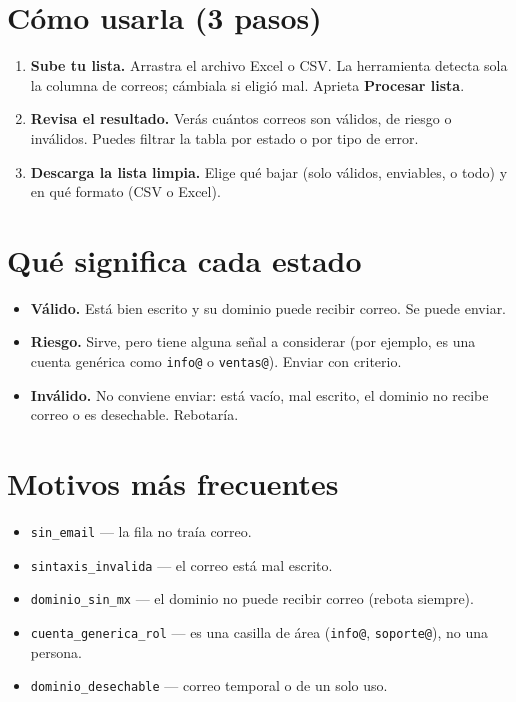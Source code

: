 \documentclass[12pt]{article}
\begin{document}
\section{Cómo usarla (3 pasos)}
\begin{enumerate}[label=\textbf{\arabic*.}]
    \item \textbf{Sube tu lista.} Arrastra el archivo Excel o CSV. La herramienta detecta
    sola la columna de correos; cámbiala si eligió mal. Aprieta \textbf{Procesar lista}.
    \item \textbf{Revisa el resultado.} Verás cuántos correos son válidos, de riesgo o
    inválidos. Puedes filtrar la tabla por estado o por tipo de error.
    \item \textbf{Descarga la lista limpia.} Elige qué bajar (solo válidos, enviables, o
    todo) y en qué formato (CSV o Excel).
\end{enumerate}

\section{Qué significa cada estado}
\begin{itemize}
    \item \textbf{Válido.} Está bien escrito y su dominio puede recibir correo. Se puede enviar.
    \item \textbf{Riesgo.} Sirve, pero tiene alguna señal a considerar (por ejemplo, es una
    cuenta genérica como \texttt{info@} o \texttt{ventas@}). Enviar con criterio.
    \item \textbf{Inválido.} No conviene enviar: está vacío, mal escrito, el dominio no recibe
    correo o es desechable. Rebotaría.
\end{itemize}

\section{Motivos más frecuentes}
\begin{itemize}
    \item \texttt{sin\_email} --- la fila no traía correo.
    \item \texttt{sintaxis\_invalida} --- el correo está mal escrito.
    \item \texttt{dominio\_sin\_mx} --- el dominio no puede recibir correo (rebota siempre).
    \item \texttt{cuenta\_generica\_rol} --- es una casilla de área (\texttt{info@},
    \texttt{soporte@}), no una persona.
    \item \texttt{dominio\_desechable} --- correo temporal o de un solo uso.
\end{itemize}
\end{document}
